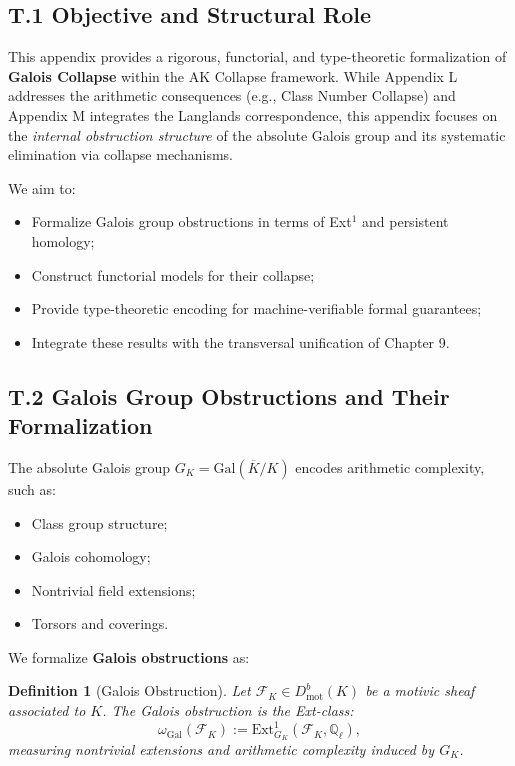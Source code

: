 \documentclass[11pt]{article}
\newtheorem{definition}[theorem]{Definition}
\begin{document}
\subsection*{T.1 Objective and Structural Role}

This appendix provides a rigorous, functorial, and type-theoretic formalization of \textbf{Galois Collapse} within the AK Collapse framework. While Appendix L addresses the arithmetic consequences (e.g., Class Number Collapse) and Appendix M integrates the Langlands correspondence, this appendix focuses on the \emph{internal obstruction structure} of the absolute Galois group and its systematic elimination via collapse mechanisms.

We aim to:
\begin{itemize}
    \item Formalize Galois group obstructions in terms of Ext$^1$ and persistent homology;
    \item Construct functorial models for their collapse;
    \item Provide type-theoretic encoding for machine-verifiable formal guarantees;
    \item Integrate these results with the transversal unification of Chapter 9.
\end{itemize}

\subsection*{T.2 Galois Group Obstructions and Their Formalization}

The absolute Galois group $G_K = \mathrm{Gal}(\overline{K}/K)$ encodes arithmetic complexity, such as:

\begin{itemize}
    \item Class group structure;
    \item Galois cohomology;
    \item Nontrivial field extensions;
    \item Torsors and coverings.
\end{itemize}

We formalize \textbf{Galois obstructions} as:

\begin{definition}[Galois Obstruction]
Let $\mathcal{F}_K \in D^b_{\mathrm{mot}}(K)$ be a motivic sheaf associated to $K$. The Galois obstruction is the Ext-class:
\[
\omega_{\mathrm{Gal}}(\mathcal{F}_K) := \mathrm{Ext}^1_{G_K}(\mathcal{F}_K, \mathbb{Q}_\ell),
\]
measuring nontrivial extensions and arithmetic complexity induced by $G_K$.
\end{definition}
\end{document}
